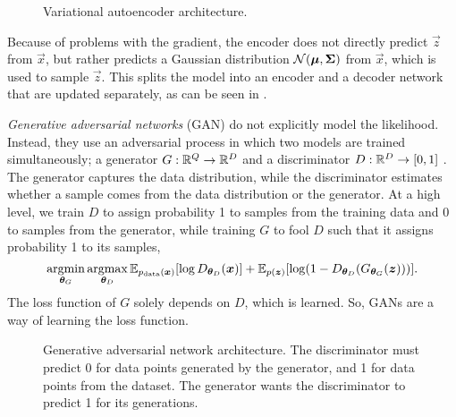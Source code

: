 \begin{figure}[ht]
    \centering
    \caption{Variational autoencoder architecture.}
    \label{fig:variational-autoencoder}
\end{figure}

Because of problems with the gradient, the encoder does not directly predict
$\vec{z}$ from $\vec{x}$, but rather predicts a Gaussian distribution
$\mathcal{N}(\bm{\mu},\bm{\Sigma})$ from $\vec{x}$, which is used to sample
$\vec{z}$. This splits the model into an encoder and a decoder network that are
updated separately, as can be seen in .

\textit{Generative adversarial networks} (GAN) do not explicitly model the
likelihood. Instead, they use an adversarial process in which two models are
trained simultaneously; a generator $G: \mathbb{R}^Q\to\mathbb{R}^D$ and a discriminator
$D:\mathbb{R}^D \to [0,1]$ \citep{goodfellow2014generative}. The generator captures the
data distribution, while the discriminator estimates whether a sample comes
from the data distribution or the generator. At a high level, we train $D$ to
assign probability 1 to samples from the training data and 0 to samples from
the generator, while training $G$ to fool $D$ such that it assigns probability
1 to its samples, \[
  \argmin_{\vec{\theta}_G}\argmax_{\vec{\theta}_D} \E_{p_{\text{data}}(\bm{x})}[\log D_{\vec{\theta}_D}(\vec{x})] + \E_{p(\vec{z})} \lft[ \log (1-D_{\vec{\theta}_D}(G_{\vec{\theta}_G}(\vec{z}))) \rgt]
.\]
The loss function of $G$ solely depends on $D$, which is learned. So, GANs
are a way of learning the loss function.

\begin{figure}[ht]
    \centering
    \caption{Generative adversarial network architecture. The discriminator must
    predict 0 for data points generated by the generator, and 1 for data points
    from the dataset. The generator wants the discriminator to predict 1 for its
    generations.}
    \label{fig:gan}
\end{figure}
